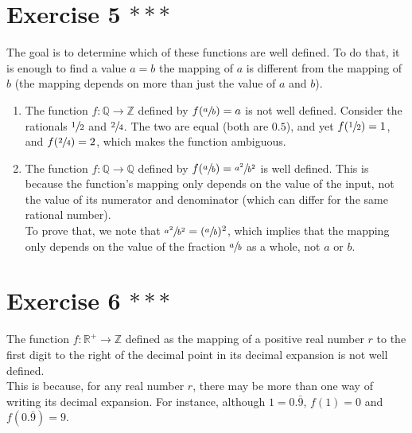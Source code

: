 \documentclass[12pt]{article}
\newcommand{\Z}{\mathbb{Z}}
\newcommand{\Q}{\mathbb{Q}}
\newcommand{\R}{\mathbb{R}}
\begin{document}
    \section*{Exercise 5 $***$}
    The goal is to determine which of these functions are well defined.
    To do that, it is enough to find a value $a = b$
    the mapping of $a$ is different from the mapping of $b$
    (the mapping depends on more than just the value of $a$ and $b$).
    \begin{enumerate}[label=\textbf{\alph*.}]
        \item 
            The function $f: \Q \to \Z$
            defined by $f(\sfrac{a}{b}) = a$ is not well defined.
            Consider the rationals $\sfrac{1}{2}$ and $\sfrac{2}{4}$.
            The two are equal (both are $0.5$),
            and yet $f(\sfrac{1}{2}) = 1$,
            and $f(\sfrac{2}{4}) = 2$,
            which makes the function ambiguous.
        \item
            The function $f: \Q \to \Q$
            defined by $f(\sfrac{a}{b}) = \sfrac{a^2}{b^2}$
            is well defined.
            This is because the function's mapping only depends on
            the value of the input,
            not the value of its numerator and denominator
            (which can differ for the same rational number). \\
            To prove that,
            we note that $\sfrac{a^2}{b^2} = (\sfrac{a}{b})^2$,
            which implies that the mapping only depends on
            the value of the fraction $\sfrac{a}{b}$ as a whole,
            not $a$ or $b$.
    \end{enumerate}

    \section*{Exercise 6 $***$}
    The function $f: \R^+ \to \Z$
    defined as the mapping of a positive real number $r$
    to the first digit to the right of the decimal point in its
    decimal expansion is not well defined. \\
    This is because,
    for any real number $r$,
    there may be more than one way of writing its decimal expansion.
    For instance, although $1 = 0.\bar{9}$,
    $f(1) = 0$ and $f(0.\bar{9}) = 9$. \\
\end{document}
